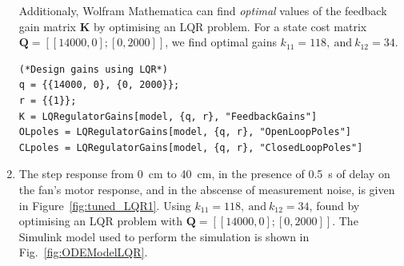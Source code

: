 \documentclass[10pt,twoside,openright]{article}
\begin{document}
\begin{enumerate}
		Additionaly, Wolfram Mathematica can find \textit{optimal} values of the feedback gain matrix $\bm{K}$ by optimising an LQR problem. For a state cost matrix $\bm{Q} = [[14000, 0]; [0, 2000]]$, we find optimal gains $k_{11} = 118,~\text{and}~k_{12} = 34$. 
		
\begin{lstlisting}[style=mathematica]
(*Design gains using LQR*)
q = {{14000, 0}, {0, 2000}};
r = {{1}};
K = LQRegulatorGains[model, {q, r}, "FeedbackGains"] 
OLpoles = LQRegulatorGains[model, {q, r}, "OpenLoopPoles"]
CLpoles = LQRegulatorGains[model, {q, r}, "ClosedLoopPoles"]
\end{lstlisting}

\item The step response from 0~cm to 40~cm, in the presence of 0.5~s of delay on the fan's motor response, and in the abscense of measurement noise, is given in Figure~\ref{fig:tuned_LQR1}. Using $k_{11} = 118,~\text{and}~k_{12} = 34$, found by optimising an LQR problem with $\bm{Q} = [[14000, 0]; [0, 2000]]$. The Simulink model used to perform the simulation is shown in Fig.~\ref{fig:ODEModelLQR}.

\end{enumerate}
\end{document}
